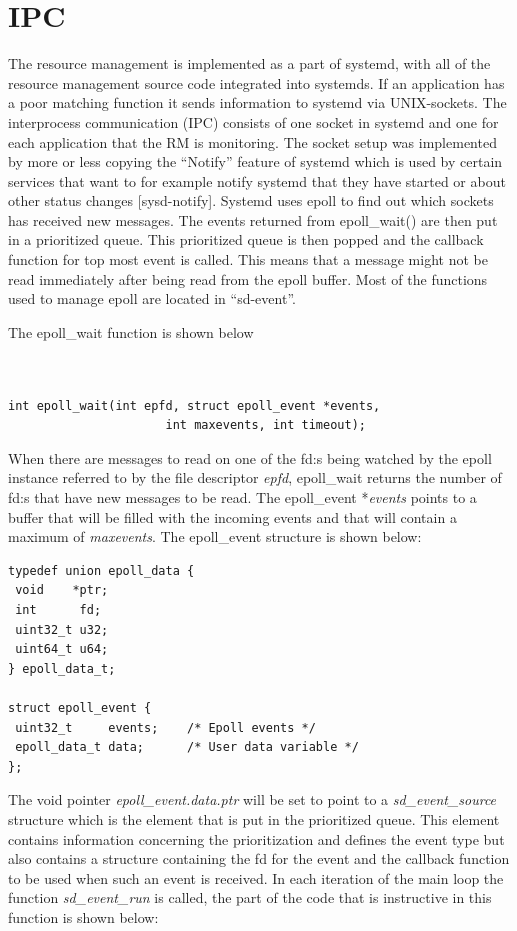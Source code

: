 \documentclass[nobiblatex]{LTHthesis}
\begin{document}
\section{IPC}
The resource management is implemented as a part of systemd, with all of the resource management source code integrated into systemds. If an application has a poor matching function it sends information to systemd via UNIX-sockets. The interprocess communication (IPC) consists of one socket in systemd and one for each application that the RM is monitoring. The socket setup was implemented by more or less copying the “Notify” feature of systemd which is used by certain services that want to for example notify systemd that they have started or about other status changes [sysd-notify].
Systemd uses epoll to find out which sockets has received new messages. The events returned from epoll\_wait() are then put in a prioritized queue. This prioritized queue is then popped and the callback function for top most event is called. This means that a message might not be read immediately after being read from the epoll buffer. Most of the functions used to manage epoll are located in “sd-event”. 


The epoll\_wait function is shown below
\begin{verbatim}


int epoll_wait(int epfd, struct epoll_event *events,
                      int maxevents, int timeout);	 
\end{verbatim}
When there are messages to read on one of the fd:s being watched by the epoll instance referred to by the file descriptor \emph{epfd}, epoll\_wait returns the number of fd:s that have new messages to be read.
The epoll\_event *\emph{events} points to a buffer that will be filled with the incoming events and that will contain a maximum of \emph{maxevents}.
The epoll\_event structure is shown below:

%

\begin{verbatim}
typedef union epoll_data {
 void    *ptr;
 int      fd;
 uint32_t u32;
 uint64_t u64;
} epoll_data_t;

struct epoll_event {
 uint32_t     events;    /* Epoll events */
 epoll_data_t data;      /* User data variable */
};
\end{verbatim}

The void pointer \emph{epoll\_event.data.ptr} will be set to point to a \emph{sd\_event\_source} structure which is the element that is put in the prioritized queue. This element contains information concerning the prioritization and  defines the event type but also contains a structure containing the fd for the event and the callback function to be used when such an event is received.
In each iteration of the main loop the function \emph{sd\_event\_run} is called, the part of the code that is instructive in this function is shown below:
\end{document}
